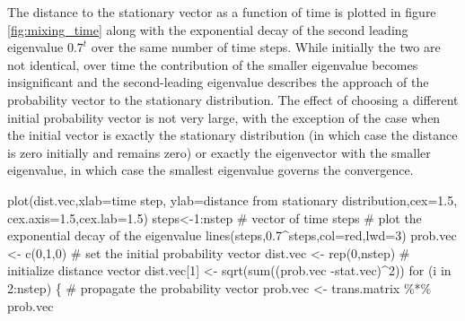 \documentclass[
  letterpaper,
  DIV=11,
  numbers=noendperiod]{scrreprt}
\newenvironment{Shaded}{\begin{snugshade}}{\end{snugshade}}
\newcommand{\AttributeTok}[1]{\textcolor[rgb]{0.40,0.45,0.13}{#1}}
\newcommand{\CommentTok}[1]{\textcolor[rgb]{0.37,0.37,0.37}{#1}}
\newcommand{\ControlFlowTok}[1]{\textcolor[rgb]{0.00,0.23,0.31}{#1}}
\newcommand{\DecValTok}[1]{\textcolor[rgb]{0.68,0.00,0.00}{#1}}
\newcommand{\FloatTok}[1]{\textcolor[rgb]{0.68,0.00,0.00}{#1}}
\newcommand{\FunctionTok}[1]{\textcolor[rgb]{0.28,0.35,0.67}{#1}}
\newcommand{\NormalTok}[1]{\textcolor[rgb]{0.00,0.23,0.31}{#1}}
\newcommand{\OtherTok}[1]{\textcolor[rgb]{0.00,0.23,0.31}{#1}}
\newcommand{\SpecialCharTok}[1]{\textcolor[rgb]{0.37,0.37,0.37}{#1}}
\newcommand{\StringTok}[1]{\textcolor[rgb]{0.13,0.47,0.30}{#1}}
\begin{document}
The distance to the stationary vector as a function of time is plotted
in figure \ref{fig:mixing_time} along with the exponential decay of the
second leading eigenvalue \(0.7^t\) over the same number of time steps.
While initially the two are not identical, over time the contribution of
the smaller eigenvalue becomes insignificant and the second-leading
eigenvalue describes the approach of the probability vector to the
stationary distribution. The effect of choosing a different initial
probability vector is not very large, with the exception of the case
when the initial vector is exactly the stationary distribution (in which
case the distance is zero initially and remains zero) or exactly the
eigenvector with the smaller eigenvalue, in which case the smallest
eigenvalue governs the convergence.

\begin{Shaded}
\begin{Highlighting}[]
\FunctionTok{plot}\NormalTok{(dist.vec,}\AttributeTok{xlab=}\StringTok{\textquotesingle{}time step\textquotesingle{}}\NormalTok{, }\AttributeTok{ylab=}\StringTok{\textquotesingle{}distance from stationary distribution\textquotesingle{}}\NormalTok{,}\AttributeTok{cex=}\FloatTok{1.5}\NormalTok{, }\AttributeTok{cex.axis=}\FloatTok{1.5}\NormalTok{,}\AttributeTok{cex.lab=}\FloatTok{1.5}\NormalTok{)}
\NormalTok{steps}\OtherTok{\textless{}{-}}\DecValTok{1}\SpecialCharTok{:}\NormalTok{nstep }\CommentTok{\# vector of time steps }
\CommentTok{\# plot the exponential decay of the eigenvalue}
\FunctionTok{lines}\NormalTok{(steps,}\FloatTok{0.7}\SpecialCharTok{\^{}}\NormalTok{steps,}\AttributeTok{col=}\StringTok{\textquotesingle{}red\textquotesingle{}}\NormalTok{,}\AttributeTok{lwd=}\DecValTok{3}\NormalTok{) }
\NormalTok{prob.vec }\OtherTok{\textless{}{-}} \FunctionTok{c}\NormalTok{(}\DecValTok{0}\NormalTok{,}\DecValTok{1}\NormalTok{,}\DecValTok{0}\NormalTok{) }\CommentTok{\# set the initial probability vector}
\NormalTok{dist.vec }\OtherTok{\textless{}{-}} \FunctionTok{rep}\NormalTok{(}\DecValTok{0}\NormalTok{,nstep) }\CommentTok{\# initialize distance vector}
\NormalTok{dist.vec[}\DecValTok{1}\NormalTok{] }\OtherTok{\textless{}{-}} \FunctionTok{sqrt}\NormalTok{(}\FunctionTok{sum}\NormalTok{((prob.vec }\SpecialCharTok{{-}}\NormalTok{stat.vec)}\SpecialCharTok{\^{}}\DecValTok{2}\NormalTok{))}
\ControlFlowTok{for}\NormalTok{ (i }\ControlFlowTok{in} \DecValTok{2}\SpecialCharTok{:}\NormalTok{nstep) \{ }\CommentTok{\# propagate the probability vector}
\NormalTok{  prob.vec }\OtherTok{\textless{}{-}}\NormalTok{ trans.matrix }\SpecialCharTok{\%*\%}\NormalTok{ prob.vec}

\end{Highlighting}
\end{Shaded}
\end{document}
